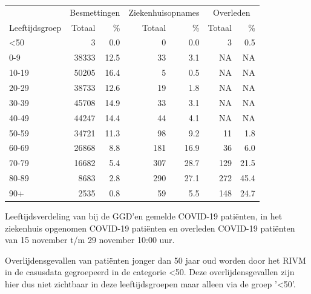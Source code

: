 \documentclass[
  english,
  man,floatsintext]{apa6}
\begin{document}
\begin{table}
\centering\begingroup\fontsize{11}{13}\selectfont

\begin{threeparttable}
\begin{tabular}{lrrrrrr}
\toprule
\multicolumn{1}{c}{ } & \multicolumn{2}{c}{Besmettingen} & \multicolumn{2}{c}{Ziekenhuisopnames} & \multicolumn{2}{c}{Overleden} \\
\cmidrule(l{3pt}r{3pt}){2-3} \cmidrule(l{3pt}r{3pt}){4-5} \cmidrule(l{3pt}r{3pt}){6-7}
Leeftijdsgroep & Totaal & \% & Totaal & \% & Totaal & \%\\
\midrule
<50 & 3 & 0.0 & 0 & 0.0 & 3 & 0.5\\
0-9 & 38333 & 12.5 & 33 & 3.1 & NA & NA\\
10-19 & 50205 & 16.4 & 5 & 0.5 & NA & NA\\
20-29 & 38733 & 12.6 & 19 & 1.8 & NA & NA\\
30-39 & 45708 & 14.9 & 33 & 3.1 & NA & NA\\
40-49 & 44247 & 14.4 & 44 & 4.1 & NA & NA\\
50-59 & 34721 & 11.3 & 98 & 9.2 & 11 & 1.8\\
60-69 & 26868 & 8.8 & 181 & 16.9 & 36 & 6.0\\
70-79 & 16682 & 5.4 & 307 & 28.7 & 129 & 21.5\\
80-89 & 8683 & 2.8 & 290 & 27.1 & 272 & 45.4\\
90+ & 2535 & 0.8 & 59 & 5.5 & 148 & 24.7\\
\bottomrule
\end{tabular}
\begin{tablenotes}
\item[1] Leeftijdsverdeling van bij de GGD’en gemelde COVID-19 patiënten, in het ziekenhuis opgenomen COVID-19 patiënten en overleden COVID-19 patiënten van 15 november t/m 29 november 10:00 uur.
\item[2] Overlijdensgevallen van patiënten jonger dan 50 jaar oud worden door het RIVM in de casusdata gegroepeerd in de categorie <50. Deze overlijdensgevallen zijn hier dus niet zichtbaar in deze leeftijdsgroepen maar alleen via de groep '<50'.
\end{tablenotes}
\end{threeparttable}
\endgroup{}
\end{table}

\newpage
\end{document}

